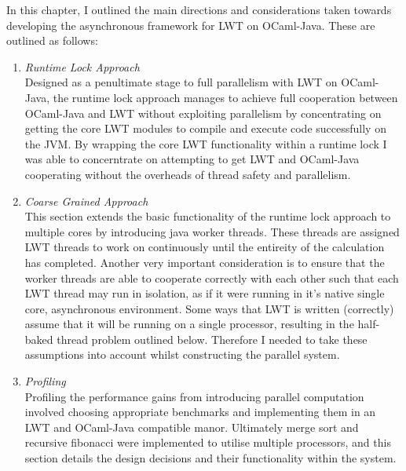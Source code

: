 \documentclass[12pt,twoside,notitlepage]{report}
\begin{document}
%
%

In this chapter, I outlined the main directions and considerations taken towards developing the asynchronous framework for LWT on OCaml-Java. These are outlined as follows:
\begin{enumerate}
\item {\em Runtime Lock Approach} \hfill \\
Designed as a penultimate stage to full parallelism with LWT on OCaml-Java, the runtime lock approach manages to achieve full cooperation between OCaml-Java and LWT without exploiting parallelism by concentrating on getting the core
LWT modules to compile and execute code successfully on the JVM. By wrapping the core LWT functionality within a runtime lock I was able to concerntrate on attempting to get LWT and OCaml-Java cooperating without the overheads of
thread safety and parallelism.
\item {\em Coarse Grained Approach} \hfill \\
This section extends the basic functionality of the runtime lock approach to multiple cores by introducing java worker threads. These threads are assigned LWT threads to work on continuously until the entireity of the calculation has
completed. Another very important consideration is to ensure that the worker threads are able to cooperate correctly with each other such that each LWT thread may run in isolation, as if it were running in it's native single core,
asynchronous environment. Some ways that LWT is written (correctly) assume that it will be running on a single processor, resulting in the half-baked thread problem outlined below. Therefore I needed to take these assumptions into
account whilst constructing the parallel system.
\item {\em Profiling} \hfill \\
Profiling the performance gains from introducing parallel computation involved choosing appropriate benchmarks and implementing them in an LWT and OCaml-Java compatible manor. Ultimately merge sort and recursive fibonacci were
implemented to utilise multiple processors, and this section details the design decisions and their functionality within the system.
\end{enumerate}
\end{document}
